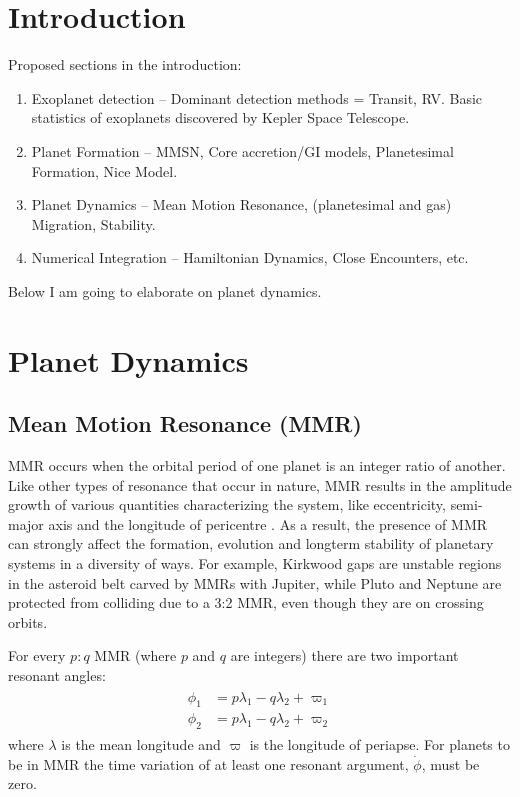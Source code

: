 \documentclass[12pt,letter]{aastex}
\date{Draft version: \today}
\begin{document}
\section{Introduction}

Proposed sections in the introduction:
\begin{enumerate}
\item Exoplanet detection -- Dominant detection methods = Transit, RV. Basic statistics of exoplanets discovered by Kepler Space Telescope. 
\item Planet Formation -- MMSN, Core accretion/GI models, Planetesimal Formation, Nice Model. 
\item Planet Dynamics -- Mean Motion Resonance, (planetesimal and gas) Migration,  Stability.
\item Numerical Integration -- Hamiltonian Dynamics, Close Encounters, etc. 
\end{enumerate}

Below I am going to elaborate on planet dynamics. 

\section{Planet Dynamics}
\subsection{Mean Motion Resonance (MMR)}
\label{sec:MMR}
MMR occurs when the orbital period of one planet is an integer ratio of another. 
Like other types of resonance that occur in nature, MMR results in the amplitude growth of various quantities characterizing the system, like eccentricity, semi-major axis and the longitude of pericentre \citep{SSD1999}. 
As a result, the presence of MMR can strongly affect the formation, evolution and longterm stability of planetary systems in a diversity of ways.
For example, Kirkwood gaps are unstable regions in the asteroid belt carved by MMRs with Jupiter, while Pluto and Neptune are protected from colliding due to a 3:2 MMR, even though they are on crossing orbits. 

For every $p:q$ MMR (where $p$ and $q$ are integers) there are two important resonant angles:
\begin{align*}
\begin{split}
\phi_1 &= p\lambda_1 - q\lambda_2 + \varpi_1 \\
\phi_2 &= p\lambda_1 - q\lambda_2 + \varpi_2 
\end{split}
\end{align*}
where $\lambda$ is the mean longitude and $\varpi$ is the longitude of periapse. 
For planets to be in MMR the time variation of at least one resonant argument, $\dot{\phi}$, must be zero.
\end{document}
